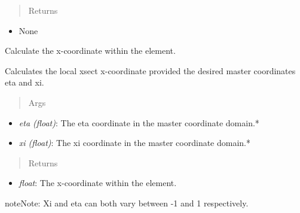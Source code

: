 \documentclass[letterpaper,10pt,english]{sphinxmanual}
\begin{document}
\begin{fulllineitems}
\begin{fulllineitems}
\begin{itemize}
\end{itemize}
\begin{quote}\begin{description}
\item[{Returns}] \leavevmode
\end{description}\end{quote}
\begin{itemize}
\item {} 
None

\end{itemize}

\end{fulllineitems}


\begin{fulllineitems}
\label{structures:AeroComBAT.Structures.CQUAD4.x}
Calculate the x-coordinate within the element.

Calculates the local xsect x-coordinate provided the desired master
coordinates eta and xi.
\begin{quote}\begin{description}
\item[{Args}] \leavevmode
\end{description}\end{quote}
\begin{itemize}
\item {} 
\emph{eta (float)}: The eta coordinate in the master coordinate domain.*

\item {} 
\emph{xi (float)}: The xi coordinate in the master coordinate domain.*

\end{itemize}
\begin{quote}\begin{description}
\item[{Returns}] \leavevmode
\end{description}\end{quote}
\begin{itemize}
\item {} 
\emph{float}: The x-coordinate within the element.

\end{itemize}

\begin{notice}{note}{Note:}
Xi and eta can both vary between -1 and 1 respectively.
\end{notice}


\end{fulllineitems}
\end{fulllineitems}
\end{document}
